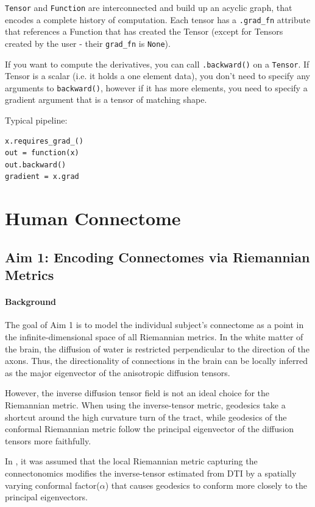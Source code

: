 \documentclass{article}
\theoremstyle{definition}
\theoremstyle{plain}
\begin{document}
\texttt{Tensor} and \texttt{Function} are interconnected and build up an acyclic graph, that encodes a complete history of computation. Each tensor has a \texttt{.grad\_fn} attribute that references a Function that has created the Tensor (except for Tensors created by the user - their \texttt{grad\_fn} is \texttt{None}).

If you want to compute the derivatives, you can call \texttt{.backward()} on a \texttt{Tensor}. If Tensor is a scalar (i.e. it holds a one element data), you don’t need to specify any arguments to \texttt{backward()}, however if it has more elements, you need to specify a gradient argument that is a tensor of matching shape. 

Typical pipeline:
\begin{verbatim}
x.requires_grad_()
out = function(x)
out.backward()
gradient = x.grad    
\end{verbatim}

\newpage
\section{Human Connectome}
\subsection{Aim 1: Encoding Connectomes via Riemannian Metrics}
\paragraph{Background}The goal of Aim 1 is to model the individual subject's connectome as a point in the infinite-dimensional space of all Riemannian metrics. In the white matter of the brain, the diffusion of water is restricted perpendicular to the direction of the axons. Thus, the directionality of connections in the brain can be locally inferred as the major eigenvector of the anisotropic diffusion tensors.

However, the inverse diffusion tensor field is not an ideal choice for the Riemannian metric. When using the inverse-tensor metric, geodesics take a shortcut around the high curvature turn of the tract, while geodesics of the conformal Riemannian metric follow the principal eigenvector of the diffusion tensors more faithfully. 

In \cite{hao}, it was assumed that the local Riemannian metric capturing the connectonomics modifies the inverse-tensor estimated from DTI by a spatially varying conformal factor($\alpha$) that causes geodesics to conform more closely to the principal eigenvectors.
\end{document}
